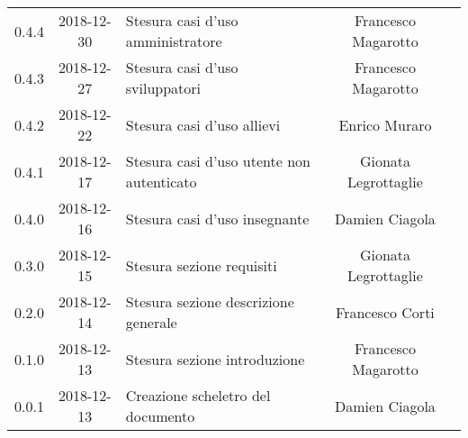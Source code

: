 {\begin{longtable}{ c c C{6cm} c c }
		0.4.4 & 
		2018-12-30 &  
		Stesura casi d'uso amministratore &	
		Francesco Magarotto &	
		\reda{} \\
		
		0.4.3 & 
		2018-12-27 &  
		Stesura casi d'uso sviluppatori &	
		Francesco Magarotto &	
		\reda{} \\
		
		0.4.2 & 
		2018-12-22 &  
		Stesura casi d'uso allievi &	
		Enrico Muraro	&	
		\reda{} \\	
		
		0.4.1 & 
		2018-12-17 &  
		Stesura casi d'uso utente non autenticato &	
		Gionata Legrottaglie &	
		\reda{} \\
		
		0.4.0 & 
		2018-12-16 &  
		Stesura casi d'uso insegnante &	
		Damien Ciagola &	
		\reda{} \\
		
		0.3.0 & 
		2018-12-15 &  
		Stesura sezione requisiti &	
		Gionata Legrottaglie &	
		\reda{} \\
		
		0.2.0 & 
		2018-12-14 &  
		Stesura sezione descrizione generale	&	
		Francesco Corti &
		\reda{} \\
		
		0.1.0 & 
		2018-12-13 &  
		Stesura sezione introduzione &	
		Francesco Magarotto &	
		\reda{}  \\
		
		0.0.1 & 
		2018-12-13 &  
		Creazione scheletro del documento&	
		Damien Ciagola  &	
		\reda{}  \\
	\end{longtable}

}